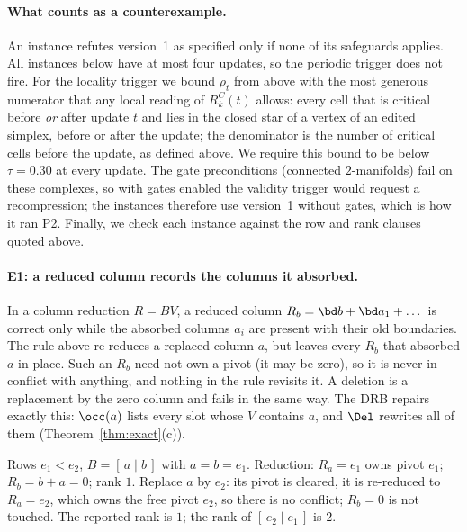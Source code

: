 \paragraph{What counts as a counterexample.}
An instance refutes version~1 as specified only if none of its safeguards
applies. All instances below have at most four updates, so the periodic trigger
does not fire. For the locality trigger we bound $\rho_t$ from above with the
most generous numerator that any local reading of $R_k^C(t)$ allows: every cell
that is critical before \emph{or} after update $t$ and lies in the closed star of
a vertex of an edited simplex, before or after the update; the denominator is
the number of critical cells before the update, as defined above. We require
this bound to be below $\tau=0.30$ at every update. The gate preconditions
(connected $2$-manifolds) fail on these complexes, so with gates enabled the
validity trigger would request a recompression; the instances therefore use
version~1 without gates, which is how it ran P2. Finally, we
check each instance against the row and rank clauses quoted above.

\paragraph{E1: a reduced column records the columns it absorbed.}
In a column reduction $R=BV$, a reduced column $R_b=\bd b+\bd a_1+\dots$ is
correct only while the absorbed columns $a_i$ are present with their old
boundaries. The rule above re-reduces a replaced column $a$, but leaves every
$R_b$ that absorbed $a$ in place. Such an $R_b$ need not own a pivot (it may be
zero), so it is never in conflict with anything, and nothing in the rule
revisits it. A deletion is a replacement by the zero column and fails in the
same way. The DRB repairs exactly this: $\occ(a)$ lists every slot whose $V$
contains $a$, and $\Del$ rewrites all of them (Theorem~\ref{thm:exact}(c)).

\begin{example}\label{ex:e1-matrix}
Rows $e_1<e_2$, $B=[\,a\mid b\,]$ with $a=b=e_1$. Reduction: $R_a=e_1$ owns pivot
$e_1$; $R_b=b+a=0$; rank $1$. Replace $a$ by $e_2$: its pivot is cleared, it is
re-reduced to $R_a=e_2$, which owns the free pivot $e_2$, so there is no
conflict; $R_b=0$ is not touched. The reported rank is $1$; the rank of
$[\,e_2\mid e_1\,]$ is $2$.
\end{example}

